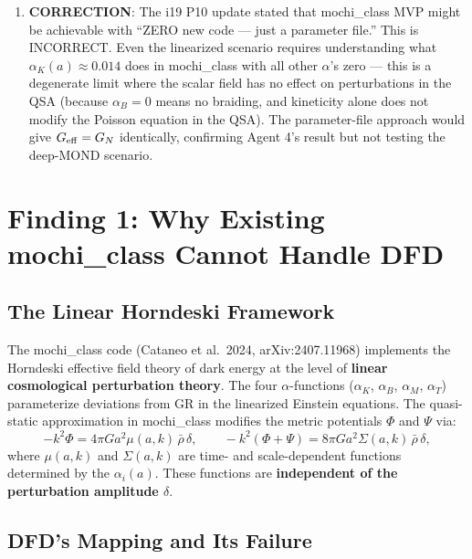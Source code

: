 \documentclass[11pt]{article}
\theoremstyle{definition}
\theoremstyle{remark}
\newcommand{\Geff}{G_{\rm eff}}
\begin{document}
\begin{tcolorbox}[colback=red!5!white, colframe=red!60!black,
  title=\textbf{INCONSISTENCIES AND FLAGS}]
\begin{enumerate}[nosep]
\item \textbf{CORRECTION}: The i19 P10 update stated that mochi\_class
  MVP might be achievable with ``ZERO new code --- just a parameter
  file.'' This is INCORRECT. Even the linearized scenario requires
  understanding what $\alpha_K(a) \approx 0.014$ does in mochi\_class
  with all other $\alpha$'s zero --- this is a degenerate limit where
  the scalar field has no effect on perturbations in the QSA (because
  $\alpha_B = 0$ means no braiding, and kineticity alone does not
  modify the Poisson equation in the QSA). The parameter-file approach
  would give $\Geff = G_N$ identically, confirming Agent 4's result
  but not testing the deep-MOND scenario.
\end{enumerate}
\end{tcolorbox}

\newpage
\tableofcontents
\newpage

\section{Finding 1: Why Existing mochi\_class Cannot Handle DFD}
\label{sec:mochi-fails}

\subsection{The Linear Horndeski Framework}

The mochi\_class code (Cataneo et al.\ 2024, arXiv:2407.11968)
implements the Horndeski effective field theory of dark energy at
the level of \textbf{linear cosmological perturbation theory}. The
four $\alpha$-functions ($\alpha_K$, $\alpha_B$, $\alpha_M$,
$\alpha_T$) parameterize deviations from GR in the linearized
Einstein equations. The quasi-static approximation in mochi\_class
modifies the metric potentials $\Phi$ and $\Psi$ via:
\begin{equation}
-k^2\Phi = 4\pi G a^2 \mu(a,k)\,\bar\rho\,\delta, \qquad
-k^2(\Phi + \Psi) = 8\pi G a^2 \Sigma(a,k)\,\bar\rho\,\delta,
\label{eq:mochi-QSA}
\end{equation}
where $\mu(a,k)$ and $\Sigma(a,k)$ are time- and scale-dependent
functions determined by the $\alpha_i(a)$. These functions are
\textbf{independent of the perturbation amplitude $\delta$}.

\subsection{DFD's Mapping and Its Failure}
\end{document}
